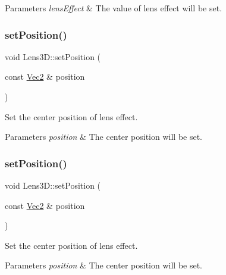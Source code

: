 \begin{DoxyParams}{Parameters}
{\em lens\+Effect} & The value of lens effect will be set. \\
\hline
\end{DoxyParams}
\mbox{\label{classLens3D_a1d9650798d3531090fef66a64da15be8}} 
\subsubsection{\texorpdfstring{set\+Position()}{setPosition()}\hspace{0.1cm}{\footnotesize\ttfamily [1/2]}}
{\footnotesize\ttfamily void Lens3\+D\+::set\+Position (\begin{DoxyParamCaption}\item[{const \hyperlink{classVec2}{Vec2} \&}]{position }\end{DoxyParamCaption})}



Set the center position of lens effect. 


\begin{DoxyParams}{Parameters}
{\em position} & The center position will be set. \\
\hline
\end{DoxyParams}
\mbox{\label{classLens3D_a1d9650798d3531090fef66a64da15be8}} 
\subsubsection{\texorpdfstring{set\+Position()}{setPosition()}\hspace{0.1cm}{\footnotesize\ttfamily [2/2]}}
{\footnotesize\ttfamily void Lens3\+D\+::set\+Position (\begin{DoxyParamCaption}\item[{const \hyperlink{classVec2}{Vec2} \&}]{position }\end{DoxyParamCaption})}



Set the center position of lens effect. 


\begin{DoxyParams}{Parameters}
{\em position} & The center position will be set. \\
\hline
\end{DoxyParams}
\mbox{\label{classLens3D_a927eb7e63d32fd9f2f8db744524d380f}} 
